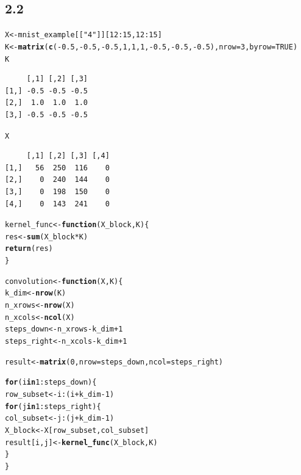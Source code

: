 \documentclass[10pt, a4paper, english]{article}\usepackage[]{graphicx}\usepackage[dvipsnames]{xcolor}
\makeatletter
\newcommand{\hlnum}[1]{\textcolor[rgb]{0.686,0.059,0.569}{#1}}%
\newcommand{\hlstr}[1]{\textcolor[rgb]{0.192,0.494,0.8}{#1}}%
\newcommand{\hlopt}[1]{\textcolor[rgb]{0,0,0}{#1}}%
\newcommand{\hlstd}[1]{\textcolor[rgb]{0.345,0.345,0.345}{#1}}%
\newcommand{\hlkwa}[1]{\textcolor[rgb]{0.161,0.373,0.58}{\textbf{#1}}}%
\newcommand{\hlkwb}[1]{\textcolor[rgb]{0.69,0.353,0.396}{#1}}%
\newcommand{\hlkwc}[1]{\textcolor[rgb]{0.333,0.667,0.333}{#1}}%
\newcommand{\hlkwd}[1]{\textcolor[rgb]{0.737,0.353,0.396}{\textbf{#1}}}%
\newenvironment{kframe}{%
 \def\at@end@of@kframe{}%
 \ifinner\ifhmode%
  \def\at@end@of@kframe{\end{minipage}}%
  \begin{minipage}{\columnwidth}%
 \fi\fi%
 \def\FrameCommand##1{\hskip\@totalleftmargin \hskip-\fboxsep
 \colorbox{shadecolor}{##1}\hskip-\fboxsep
     \hskip-\linewidth \hskip-\@totalleftmargin \hskip\columnwidth}%
 \MakeFramed {\advance\hsize-\width
   \@totalleftmargin\z@ \linewidth\hsize
   \@setminipage}}%
 {\par\unskip\endMakeFramed%
 \at@end@of@kframe}
\newenvironment{knitrout}{}{} %
\makeatother
\begin{document}
\subsection{2.2}
\begin{knitrout}
\color{fgcolor}\begin{kframe}
\begin{alltt}
\hlstd{X} \hlkwb{<-} \hlstd{mnist_example[[}\hlstr{"4"}\hlstd{]][}\hlnum{12}\hlopt{:} \hlnum{15}\hlstd{,} \hlnum{12}\hlopt{:} \hlnum{15}\hlstd{]}
\hlstd{K} \hlkwb{<-} \hlkwd{matrix}\hlstd{(}\hlkwd{c}\hlstd{(}\hlopt{-}\hlnum{0.5}\hlstd{,} \hlopt{-}\hlnum{0.5}\hlstd{,} \hlopt{-}\hlnum{0.5}\hlstd{,} \hlnum{1}\hlstd{,} \hlnum{1}\hlstd{,} \hlnum{1}\hlstd{,} \hlopt{-}\hlnum{0.5}\hlstd{,} \hlopt{-}\hlnum{0.5}\hlstd{,} \hlopt{-}\hlnum{0.5}\hlstd{) ,} \hlkwc{nrow} \hlstd{=} \hlnum{3}\hlstd{,} \hlkwc{byrow} \hlstd{=} \hlnum{TRUE}\hlstd{)}
\hlstd{K}
\end{alltt}
\begin{verbatim}
     [,1] [,2] [,3]
[1,] -0.5 -0.5 -0.5
[2,]  1.0  1.0  1.0
[3,] -0.5 -0.5 -0.5
\end{verbatim}
\begin{alltt}
\hlstd{X}
\end{alltt}
\begin{verbatim}
     [,1] [,2] [,3] [,4]
[1,]   56  250  116    0
[2,]    0  240  144    0
[3,]    0  198  150    0
[4,]    0  143  241    0
\end{verbatim}
\begin{alltt}
\hlstd{kernel_func} \hlkwb{<-} \hlkwa{function}\hlstd{(}\hlkwc{X_block}\hlstd{,} \hlkwc{K}\hlstd{)\{}
  \hlstd{res} \hlkwb{<-} \hlkwd{sum}\hlstd{(X_block}\hlopt{*}\hlstd{K)}
  \hlkwd{return}\hlstd{(res)}
\hlstd{\}}

\hlstd{convolution} \hlkwb{<-} \hlkwa{function}\hlstd{(}\hlkwc{X}\hlstd{,} \hlkwc{K}\hlstd{) \{}
  \hlstd{k_dim} \hlkwb{<-} \hlkwd{nrow}\hlstd{(K)}
  \hlstd{n_xrows} \hlkwb{<-} \hlkwd{nrow}\hlstd{(X)}
  \hlstd{n_xcols} \hlkwb{<-} \hlkwd{ncol}\hlstd{(X)}
  \hlstd{steps_down} \hlkwb{<-} \hlstd{n_xrows} \hlopt{-} \hlstd{k_dim} \hlopt{+} \hlnum{1}
  \hlstd{steps_right} \hlkwb{<-} \hlstd{n_xcols} \hlopt{-} \hlstd{k_dim} \hlopt{+} \hlnum{1}

  \hlstd{result} \hlkwb{<-} \hlkwd{matrix}\hlstd{(}\hlnum{0}\hlstd{,} \hlkwc{nrow} \hlstd{= steps_down,} \hlkwc{ncol} \hlstd{= steps_right)}

  \hlkwa{for} \hlstd{(i} \hlkwa{in} \hlnum{1}\hlopt{:}\hlstd{steps_down) \{}
       \hlstd{row_subset} \hlkwb{<-} \hlstd{i}\hlopt{:}\hlstd{(i} \hlopt{+} \hlstd{k_dim} \hlopt{-} \hlnum{1}\hlstd{)}
    \hlkwa{for} \hlstd{(j} \hlkwa{in} \hlnum{1}\hlopt{:}\hlstd{steps_right) \{}
      \hlstd{col_subset} \hlkwb{<-} \hlstd{j}\hlopt{:}\hlstd{(j} \hlopt{+} \hlstd{k_dim} \hlopt{-} \hlnum{1}\hlstd{)}
      \hlstd{X_block} \hlkwb{<-} \hlstd{X[row_subset, col_subset]}
      \hlstd{result[i, j]} \hlkwb{<-} \hlkwd{kernel_func}\hlstd{(X_block, K)}
    \hlstd{\}}
  \hlstd{\}}


\end{alltt}
\end{kframe}
\end{knitrout}
\end{document}
